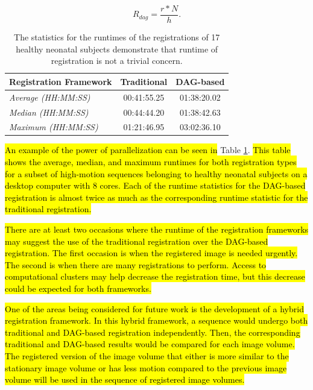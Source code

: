 \begin{equation}
R_{dag} = \frac{r*N}{h}.
\end{equation}

\begin{table}[]
\centering
\caption{The statistics for the runtimes of the registrations of 17 healthy neonatal subjects demonstrate that runtime of registration is not a trivial concern.}
\label{tab:runtime-example}
\begin{tabular}{|l|c|c|}
\hline
\textbf{Registration Framework} & \textbf{Traditional} & \textbf{DAG-based} \\ \hline
\textit{Average (HH:MM:SS)}     & 00:41:55.25          & 01:38:20.02        \\ \hline
\textit{Median (HH:MM:SS)}      & 00:44:44.20          & 01:38:42.63        \\ \hline
\textit{Maximum (HH:MM:SS)}     & 01:21:46.95          & 03:02:36.10        \\ \hline
\end{tabular}
\end{table}

\hl{An example of the power of parallelization can be seen in} Table \ref{tab:runtime-example}. \hl{This table shows the average, median, and maximum runtimes for both registration types for a subset of high-motion sequences belonging to healthy neonatal subjects on a desktop computer with 8 cores. Each of the runtime statistics for the DAG-based registration is almost twice as much as the corresponding runtime statistic for the traditional registration.}

\hl{There are at least two occasions where the runtime of the registration frameworks may suggest the use of the traditional registration over the DAG-based registration. The first occasion is when the registered image is needed urgently. The second is when there are many registrations to perform. Access to computational clusters may help decrease the registration time, but this decrease could be expected for both frameworks.}

\hl{One of the areas being considered for future work is the development of a hybrid registration framework. In this hybrid framework, a sequence would undergo both traditional and DAG-based registration independently. Then, the corresponding traditional and DAG-based results would be compared for each image volume. The registered version of the image volume that either is more similar to the stationary image volume or has less motion compared to the previous image volume will be used in the sequence of registered image volumes.}